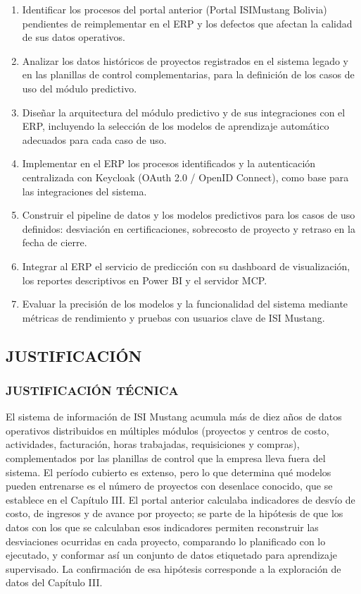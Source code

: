 \begin{enumerate}
  \item Identificar los procesos del portal anterior (Portal ISIMustang Bolivia) pendientes de reimplementar en el ERP y los defectos que afectan la calidad de sus datos operativos.
  \item Analizar los datos históricos de proyectos registrados en el sistema legado y en las planillas de control complementarias, para la definición de los casos de uso del módulo predictivo.
  \item Diseñar la arquitectura del módulo predictivo y de sus integraciones con el ERP, incluyendo la selección de los modelos de aprendizaje automático adecuados para cada caso de uso.
  \item Implementar en el ERP los procesos identificados y la autenticación centralizada con Keycloak (OAuth 2.0 / OpenID Connect), como base para las integraciones del sistema.
  \item Construir el pipeline de datos y los modelos predictivos para los casos de uso definidos: desviación en certificaciones, sobrecosto de proyecto y retraso en la fecha de cierre.
  \item Integrar al ERP el servicio de predicción con su dashboard de visualización, los reportes descriptivos en Power BI y el servidor MCP.
  \item Evaluar la precisión de los modelos y la funcionalidad del sistema mediante métricas de rendimiento y pruebas con usuarios clave de ISI Mustang.
\end{enumerate}

\subsection{JUSTIFICACIÓN}

\subsubsection{JUSTIFICACIÓN TÉCNICA}

El sistema de información de ISI Mustang acumula más de diez años de datos operativos distribuidos en múltiples módulos (proyectos y centros de costo, actividades, facturación, horas trabajadas, requisiciones y compras), complementados por las planillas de control que la empresa lleva fuera del sistema. El período cubierto es extenso, pero lo que determina qué modelos pueden entrenarse es el número de proyectos con desenlace conocido, que se establece en el Capítulo III\@. El portal anterior calculaba indicadores de desvío de costo, de ingresos y de avance por proyecto; se parte de la hipótesis de que los datos con los que se calculaban esos indicadores permiten reconstruir las desviaciones ocurridas en cada proyecto, comparando lo planificado con lo ejecutado, y conformar así un conjunto de datos etiquetado para aprendizaje supervisado. La confirmación de esa hipótesis corresponde a la exploración de datos del Capítulo III\@.

